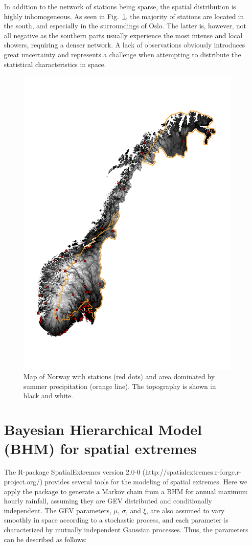 \documentclass[12pt,a4paper,english]{article}
\begin{document}
In addition to the network of stations being sparse, the spatial distribution is highly inhomogeneous. As seen in Fig.~\ref{data:fig1}, the majority of stations are located in the south, and especially in the surroundings of Oslo. The latter is, however, not all negative as the southern parts usually experience the most intense and local showers, requiring a denser network. A lack of observations obviously introduces great uncertainty and represents a challenge when attempting to distribute the statistical characteristics in space.

\begin{figure}[htbp]
\begin{center}
\includegraphics[width = 0.5\linewidth]{Figs/stations.pdf} 
\end{center}
\caption[stations]{\label{data:fig1}Map of Norway with stations (red dots) and area dominated by summer precipitation (orange line). The topography is shown in black and white.}
\end{figure}

\section{Bayesian Hierarchical Model (BHM) for spatial extremes}

The R-package SpatialExtremes version 2.0-0 (http://spatialextremes.r-forge.r-project.org/) provides several tools for the modeling of spatial extremes. Here we apply the package to generate a Markov chain from a BHM for annual maximum hourly rainfall, assuming they are GEV distributed and conditionally independent. The GEV parameters, $\mu$, $\sigma$, and $\xi$, are also assumed to vary smoothly in space according to a stochastic process, and each parameter is characterized by mutually independent Gaussian processes. Thus, the parameters can be described as follows:
\end{document}
